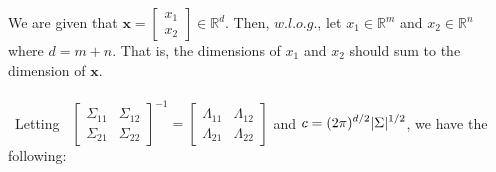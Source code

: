 \documentclass[twoside,11pt]{homework}
\DeclarePairedDelimiter{\2norm}{\lVert}{\rVert^2_2}
\newcommand{\1}[1]{\mathds{1}\left[#1\right]}
\begin{document}
We are given that $\textbf{x} = \begin{bmatrix} x_1 \\ x_2 \end{bmatrix} \in \mathbb{R}^d$. Then, $w.l.o.g.$, let $x_1 \in \mathbb{R}^m$ and $x_2 \in \mathbb{R}^n$ where $d = m + n$. That is, the dimensions of $x_1$ and $x_2$ should sum to the dimension of $\textbf{x}$. \\\ \\\
Letting \ $\begin{bmatrix} \Sigma_{11} & \Sigma_{12} \\ \Sigma_{21} & \Sigma_{22} \end{bmatrix}^{-1} = \begin{bmatrix} \Lambda_{11} & \Lambda_{12} \\ \Lambda_{21} & \Lambda_{22} \end{bmatrix} $  
and $c = \mathlarger{(2\pi)^{d/2}|\Sigma|^{1/2}}$, we have the following:
\end{document}
